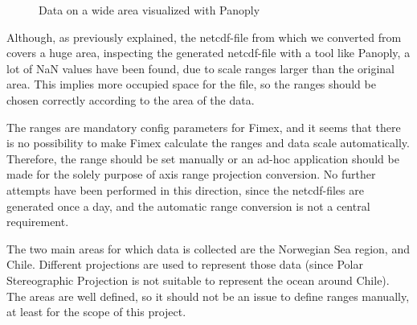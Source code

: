 \documentclass[11pt,a4paper,titlepage,oneside]{report}
\begin{document}
\begin{figure}[!htb]
  \begin{center}
    \caption{Data on a wide area visualized with Panoply}
    \label{fig:fimexPanoplyGraph}
  \end{center}
\end{figure}

Although, as previously explained, the \gls{netcdf}-file from which we converted from covers a huge area, inspecting the generated \gls{netcdf}-file with a tool like Panoply, a lot of NaN values have been found, due to scale ranges larger than the original area.
This implies more occupied space for the file, so the ranges should be chosen correctly according to the area of the data.

The ranges are mandatory config parameters for \gls{Fimex}, and it seems that there is no possibility to make \gls{Fimex} calculate the ranges and data scale automatically. Therefore, the range should be set manually or an ad-hoc application should be made for the solely purpose of axis range projection conversion. No further attempts have been performed in this direction, since the \gls{netcdf}-files are generated once a day, and the automatic range conversion is not a central requirement.

The two main areas for which data is collected are the Norwegian Sea region, and Chile. Different projections are used to represent those data (since Polar Stereographic Projection is not suitable to represent the ocean around Chile). The areas are well defined, so it should not be an issue to define ranges manually, at least for the scope of this project.
\end{document}
